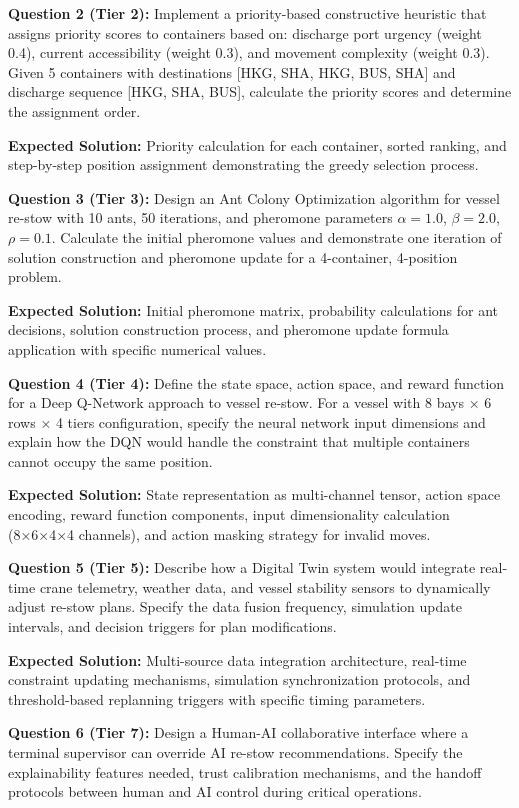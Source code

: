 \documentclass{article}
\begin{document}
\textbf{Question 2 (Tier 2):} Implement a priority-based constructive heuristic that assigns priority scores to containers based on: discharge port urgency (weight 0.4), current accessibility (weight 0.3), and movement complexity (weight 0.3). Given 5 containers with destinations [HKG, SHA, HKG, BUS, SHA] and discharge sequence [HKG, SHA, BUS], calculate the priority scores and determine the assignment order.

\textbf{Expected Solution:} Priority calculation for each container, sorted ranking, and step-by-step position assignment demonstrating the greedy selection process.

\textbf{Question 3 (Tier 3):} Design an Ant Colony Optimization algorithm for vessel re-stow with 10 ants, 50 iterations, and pheromone parameters $\alpha = 1.0$, $\beta = 2.0$, $\rho = 0.1$. Calculate the initial pheromone values and demonstrate one iteration of solution construction and pheromone update for a 4-container, 4-position problem.

\textbf{Expected Solution:} Initial pheromone matrix, probability calculations for ant decisions, solution construction process, and pheromone update formula application with specific numerical values.

\textbf{Question 4 (Tier 4):} Define the state space, action space, and reward function for a Deep Q-Network approach to vessel re-stow. For a vessel with 8 bays × 6 rows × 4 tiers configuration, specify the neural network input dimensions and explain how the DQN would handle the constraint that multiple containers cannot occupy the same position.

\textbf{Expected Solution:} State representation as multi-channel tensor, action space encoding, reward function components, input dimensionality calculation (8×6×4×4 channels), and action masking strategy for invalid moves.

\textbf{Question 5 (Tier 5):} Describe how a Digital Twin system would integrate real-time crane telemetry, weather data, and vessel stability sensors to dynamically adjust re-stow plans. Specify the data fusion frequency, simulation update intervals, and decision triggers for plan modifications.

\textbf{Expected Solution:} Multi-source data integration architecture, real-time constraint updating mechanisms, simulation synchronization protocols, and threshold-based replanning triggers with specific timing parameters.

\textbf{Question 6 (Tier 7):} Design a Human-AI collaborative interface where a terminal supervisor can override AI re-stow recommendations. Specify the explainability features needed, trust calibration mechanisms, and the handoff protocols between human and AI control during critical operations.
\end{document}
